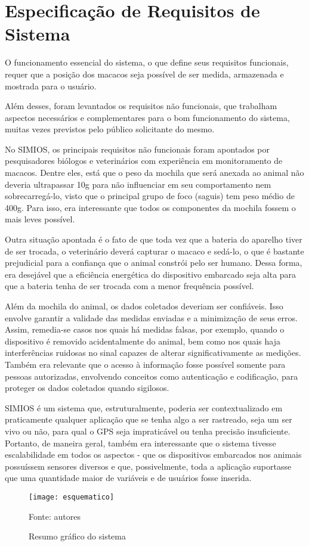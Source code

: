 \chapter{Especificação de Requisitos de Sistema}
O funcionamento essencial do sistema, o que define seus requisitos funcionais, requer que a posição dos macacos seja possível de ser medida, armazenada e mostrada para o usuário.

Além desses, foram levantados os requisitos não funcionais, que trabalham aspectos necessários e complementares para o bom funcionamento do sistema, muitas vezes previstos pelo público solicitante do mesmo.

No SIMIOS, os principais requisitos não funcionais foram apontados por pesquisadores biólogos e veterinários com experiência em monitoramento de macacos. Dentre eles, está que o peso da mochila que será anexada ao animal não deveria ultrapassar 10g para não influenciar em seu comportamento nem sobrecarregá-lo, visto que o principal grupo de foco (saguis) tem peso médio de 400g. Para isso, era interessante que todos os componentes da mochila fossem o mais leves possível.

Outra situação apontada é o fato de que toda vez que a bateria do aparelho tiver de ser trocada, o veterinário deverá capturar o macaco e sedá-lo, o que é bastante prejudicial para a confiança que o animal constrói pelo ser humano. Dessa forma, era desejável que a eficiência energética do dispositivo embarcado seja alta para que a bateria tenha de ser trocada com a menor frequência possível.

Além da mochila do animal, os dados coletados deveriam ser confiáveis. Isso envolve garantir a validade das medidas enviadas e a minimização de seus erros. Assim, remedia-se casos nos quais há medidas falsas, por exemplo, quando o dispositivo é removido acidentalmente do animal, bem como nos quais haja interferências ruidosas no sinal capazes de alterar significativamente as medições. Também era relevante que o acesso à informação fosse possível somente para pessoas autorizadas, envolvendo conceitos como autenticação e codificação, para proteger os dados coletados quando sigilosos.

SIMIOS é um sistema que, estruturalmente, poderia ser contextualizado em praticamente qualquer aplicação que se tenha algo a ser rastreado, seja um ser vivo ou não, para qual o GPS seja impraticável ou tenha precisão insuficiente. Portanto, de maneira geral, também era interessante que o sistema tivesse escalabilidade em todos os aspectos - que os dispositivos embarcados nos animais possuíssem sensores diversos e que, possivelmente, toda a aplicação suportasse que uma quantidade maior de variáveis e de usuários fosse inserida.

\begin{figure}[ht]
  \centering
  \caption{Resumo gráfico do sistema}
    \texttt{[image: esquematico]}
  \centerline{\small{Fonte: autores}}
\end{figure}
\FloatBarrier
